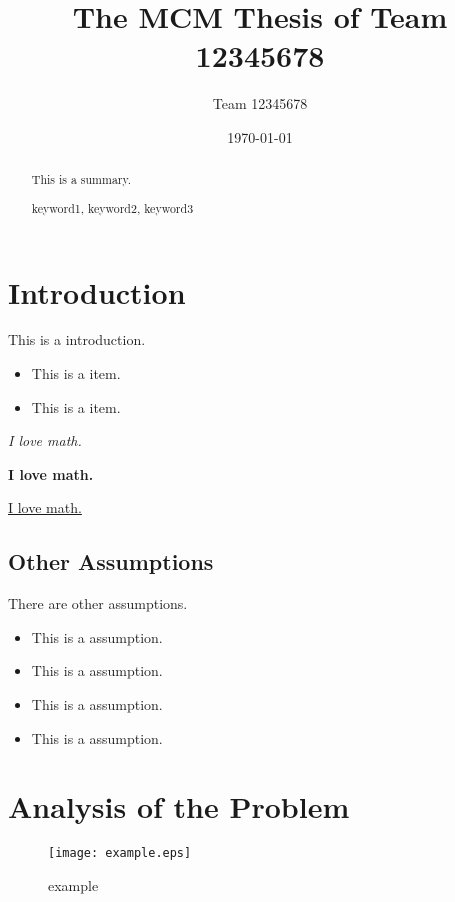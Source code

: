 \documentclass{main}  %
\title{The MCM Thesis of Team 12345678}  %
\author{\small Team 12345678}  %
\date{\today}  %
\begin{document}
\begin{abstract}  %
This is a summary.
\begin{keywords}  %
keyword1, keyword2, keyword3
\end{keywords}  %
\end{abstract}  %
\maketitle  %

\tableofcontents  %


\newpage  %
\section{Introduction}  %

This is a introduction.

\begin{itemize}  %
\item This is a item.
\item This is a item.
\end{itemize}  %

\textit{I love math.}  %

\textbf{I love math.}  %

\underline{I love math.}  %

\subsection{Other Assumptions}  %
There are other assumptions.

\begin{itemize}  %
\item This is a assumption.
\item This is a assumption.
\item This is a assumption.
\item This is a assumption.
\end{itemize}  %


\section{Analysis of the Problem}  %

\begin{figure}[h]  %
\small
\centering  %
\texttt{[image: example.eps]}  %
\caption{example} \label{fig:example}  %
\end{figure}  %
\end{document}
